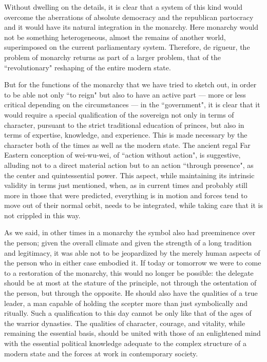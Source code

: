 Without dwelling on the details, it is clear that a system of this kind would overcome the aberrations of absolute democracy and the republican partocracy and it would have its natural integration in the monarchy. Here monarchy would not be something heterogeneous, almost the remains of another world, superimposed on the current parliamentary system. Therefore, de rigueur, the problem of monarchy returns as part of a larger problem, that of the ``revolutionary" reshaping of the entire modern state.

But for the functions of the monarchy that we have tried to sketch out, in order to be able not only ``to reign" but also to have an active part — more or less critical depending on the circumstances — in the ``government", it is clear that it would require a special qualification of the sovereign not only in terms of character, pursuant to the strict traditional education of princes, but also in terms of expertise, knowledge, and experience. This is made necessary by the character both of the times as well as the modern state. The ancient regal Far Eastern conception of wei-wu-wei, of ``action without action", is suggestive, alluding not to a direct material action but to an action ``through presence", as the center and quintessential power. This aspect, while maintaining its intrinsic validity in terms just mentioned, when, as in current times and probably still more in those that were predicted, everything is in motion and forces tend to move out of their normal orbit, needs to be integrated, while taking care that it is not crippled in this way.

As we said, in other times in a monarchy the symbol also had preeminence over the person; given the overall climate and given the strength of a long tradition and legitimacy, it was able not to be jeopardized by the merely human aspects of the person who in either case embodied it. If today or tomorrow we were to come to a restoration of the monarchy, this would no longer be possible: the delegate should be at most at the stature of the principle, not through the ostentation of the person, but through the opposite. He should also have the qualities of a true leader, a man capable of holding the scepter more than just symbolically and ritually. Such a qualification to this day cannot be only like that of the ages of the warrior dynasties. The qualities of character, courage, and vitality, while remaining the essential basis, should be united with those of an enlightened mind with the essential political knowledge adequate to the complex structure of a modern state and the forces at work in contemporary society.

